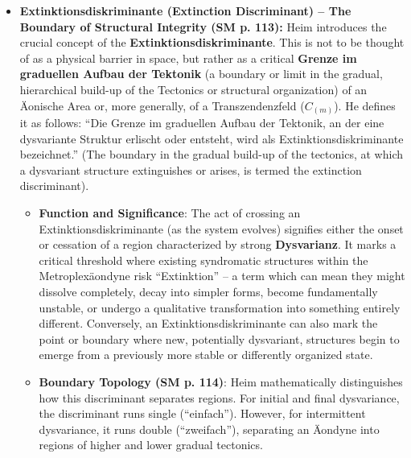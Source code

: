 \documentclass[12pt]{article}
\newcommand{\q}[1]{\enquote{#1}}
\begin{document}
\begin{itemize}
    \item \textbf{Extinktionsdiskriminante (Extinction Discriminant) – The Boundary of Structural Integrity (SM p. 113):}
    Heim introduces the crucial concept of the \textbf{Extinktionsdiskriminante}. This is not to be thought of as a physical barrier in space, but rather as a critical \textbf{Grenze im graduellen Aufbau der Tektonik} (a boundary or limit in the gradual, hierarchical build-up of the Tectonics or structural organization) of an Äonische Area or, more generally, of a Transzendenzfeld (\(C_{(m)}\)). He defines it as follows: \q{Die Grenze im graduellen Aufbau der Tektonik, an der eine dysvariante Struktur erlischt oder entsteht, wird als Extinktionsdiskriminante bezeichnet.} (The boundary in the gradual build-up of the tectonics, at which a dysvariant structure extinguishes or arises, is termed the extinction discriminant).
    \begin{itemize}
        \item \textbf{Function and Significance}: The act of crossing an Extinktionsdiskriminante (as the system evolves) signifies either the onset or cessation of a region characterized by strong \textbf{Dysvarianz}. It marks a critical threshold where existing syndromatic structures within the Metroplexäondyne risk \q{Extinktion} – a term which can mean they might dissolve completely, decay into simpler forms, become fundamentally unstable, or undergo a qualitative transformation into something entirely different. Conversely, an Extinktionsdiskriminante can also mark the point or boundary where new, potentially dysvariant, structures begin to emerge from a previously more stable or differently organized state.
        \item \textbf{Boundary Topology (SM p. 114)}: Heim mathematically distinguishes how this discriminant separates regions. For initial and final dysvariance, the discriminant runs single (\q{einfach}). However, for intermittent dysvariance, it runs double (\q{zweifach}), separating an Äondyne into regions of higher and lower gradual tectonics.
    \end{itemize}


\end{itemize}
\end{document}
